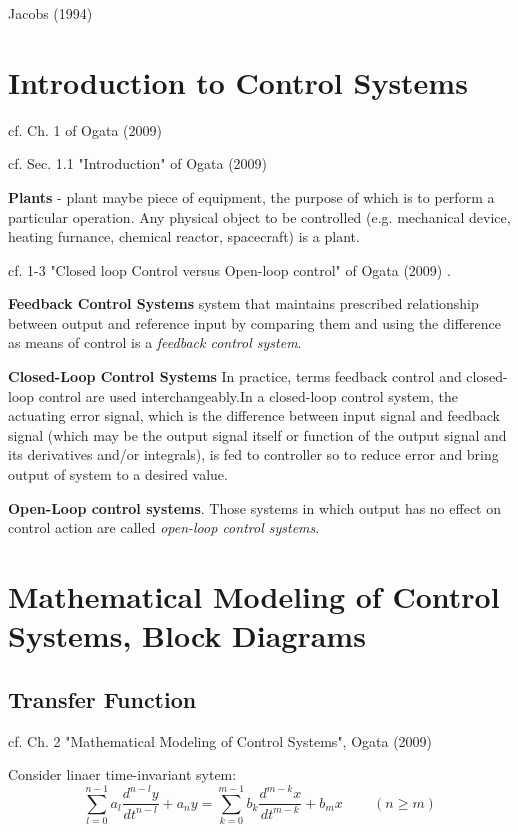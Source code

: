 \documentclass[10pt]{amsart}
\begin{document}
\begin{multicols*}{2}
Jacobs (1994) \cite{Jaco1994}

\section{Introduction to Control Systems}

cf. Ch. 1 of Ogata (2009) \cite{Ogat2009}

cf. Sec. 1.1 "Introduction" of Ogata (2009) \cite{Ogat2009}

\textbf{Plants} - plant maybe piece of equipment, the purpose of which is to perform a particular operation. Any physical object to be controlled (e.g. mechanical device, heating furnance, chemical reactor, spacecraft) is a plant.

cf. 1-3 "Closed loop Control versus Open-loop control" of Ogata (2009) \cite{Ogat2009}.

\textbf{Feedback Control Systems} system that maintains prescribed relationship between output and reference input by comparing them and using the difference as means of control is a \emph{feedback control system}.

\textbf{Closed-Loop Control Systems} In practice, terms feedback control and closed-loop control are used interchangeably.In a closed-loop control system, the actuating error signal, which is the difference between input signal and feedback signal (which may be the output signal itself or function of the output signal and its derivatives and/or integrals), is fed to controller so to reduce error and bring output of system to a desired value.

\textbf{Open-Loop control systems}. Those systems in which output has no effect on control action are called \emph{open-loop control systems}.

\section{Mathematical Modeling of Control Systems, Block Diagrams}

\subsection{Transfer Function}

cf. Ch. 2 "Mathematical Modeling of Control Systems", Ogata (2009) \cite{Ogat2009}

Consider linaer time-invariant sytem:
\begin{equation}
	\sum_{l=0}^{n-1} a_l \frac{d^{n-l} y }{dt^{n-l}} + a_n y = \sum_{k=0}^{m-1} b_k \frac{d^{m-k} x}{dt^{m-k}} + b_m x \qquad \, (n \geq m)
\end{equation}


\end{multicols*}
\end{document}
